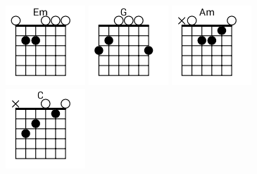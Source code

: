 \begin{figure}[h]
\predtitle\centering
\includegraphics[width=3cm]{../Akordy/em.png}
\includegraphics[width=3cm]{../Akordy/g.png}
\includegraphics[width=3cm]{../Akordy/am.png}
\includegraphics[width=3cm]{../Akordy/c.png}
\end{figure}
